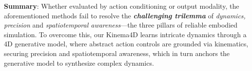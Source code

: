 \textbf{Summary}: Whether evaluated by action conditioning or output modality, the aforementioned methods fail to resolve the \textit{\textbf{challenging trilemma}} of \textit{dynamics, precision} and \textit{spatiotemporal awareness}—the three pillars of reliable embodied simulation. To overcome this, our Kinema4D learns intricate dynamics through a 4D generative model, where abstract action controls are grounded via kinematics, securing precision and spatiotemporal awareness, which in turn anchors the generative model to synthesize complex dynamics.

